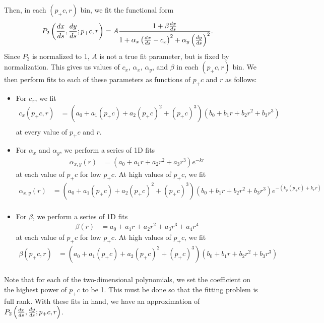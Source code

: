\documentclass[12pt]{article}
\begin{document}
Then, in each $(p_+ c, r)$ bin, we fit the functional form
\begin{align}
P_2 \left( \frac{dx}{ds}, \frac{dy}{ds}; p_+ c, r \right) & = A \frac{1 + \beta \frac{dx}{ds}}{1 + \alpha_x \left( \frac{dx}{ds} - c_x \right)^2 + \alpha_y \left( \frac{dy}{ds} \right)^2}. \label{eq:cauchy}
\end{align}
Since $P_2$ is normalized to $1$, $A$ is not a true fit parameter, but is fixed by normalization.
This gives us values of $c_x$, $\alpha_x$, $\alpha_y$, and $\beta$ in each $(p_+ c, r)$ bin.
We then perform fits to each of these parameters as functions of $p_+ c$ and $r$ as follows:
\begin{itemize}
\item
For $c_x$, we fit
\begin{align} \label{eq:cx}
c_x (p_+ c, r) & = (a_0 + a_1 (p_+c) + a_2 (p_+c)^2 + (p_+c)^3)
                   (b_0 + b_1 r + b_2 r^2 + b_3 r^3) \\
\end{align}
at every value of $p_+c$ and $r$.

\item
For $\alpha_x$ and $\alpha_y$, we perform a series of 1D fits
\begin{align} \label{eq:a1}
\alpha_{x,y}(r) & = (a_0 + a_1 r + a_2 r^2 + a_3 r^3) e^{-kr}
\end{align}
at each value of $p_+ c$ for low $p_+ c$.
At high values of $p_+ c$, we fit
\begin{align} \label{eq:a2}
\alpha_{x,y}(r) & = (a_0 + a_1 (p_+c) + a_2 (p_+c)^2 + (p_+c)^3)
                    (b_0 + b_1 r + b_2 r^2 + b_3 r^3) e^{-(k_p (p_+ c) + k_r r)} \\
\end{align}

\item
For $\beta$, we perform a series of 1D fits
\begin{align} \label{eq:beta1}
\beta(r) & = a_0 + a_1 r + a_2 r^2 + a_3 r^3 + a_4 r^4
\end{align}
at each value of $p_+ c$ for low $p_+ c$.
At high values of $p_+ c$, we fit
\begin{align} \label{eq:beta2}
\beta(p_+ c, r) & = (a_0 + a_1 (p_+c) + a_2 (p_+c)^2 + (p_+c)^3)
                    (b_0 + b_1 r + b_2 r^2 + b_3 r^3) \\
\end{align}

\end{itemize}
Note that for each of the two-dimensional polynomials, we set the coefficient on the highest power of $p_+ c$ to be 1.
This must be done so that the fitting problem is full rank.
With these fits in hand, we have an approximation of $P_2 \left( \frac{dx}{ds}, \frac{dy}{ds}; p_+ c, r \right)$.
\end{document}
